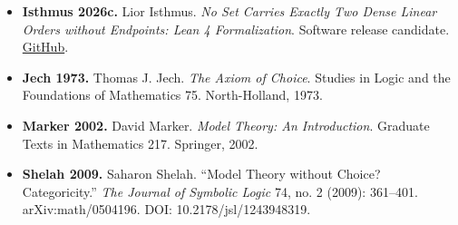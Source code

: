 \documentclass[
  english,
  11pt,
  reqno]{amsart}
\providecommand{\tightlist}{%
  \setlength{\itemsep}{0pt}\setlength{\parskip}{0pt}}
\begin{document}
\begin{itemize}
\tightlist
\item
  \textbf{Isthmus 2026c.} Lior Isthmus. \emph{No Set Carries Exactly Two
  Dense Linear Orders without Endpoints: Lean 4 Formalization}. Software
  release candidate.
  \href{https://github.com/lioristhmus/no-exactly-two-dlo-lean}{GitHub}.
\end{itemize}

\protect{}\label{ref:jech1973}

\begin{itemize}
\tightlist
\item
  \textbf{Jech 1973.} Thomas J. Jech. \emph{The Axiom of Choice}.
  Studies in Logic and the Foundations of Mathematics 75. North-Holland,
  1973.
\end{itemize}

\protect{}\label{ref:marker2002}

\begin{itemize}
\tightlist
\item
  \textbf{Marker 2002.} David Marker. \emph{Model Theory: An
  Introduction}. Graduate Texts in Mathematics 217. Springer, 2002.
\end{itemize}

\protect{}\label{ref:shelah2009}

\begin{itemize}
\tightlist
\item
  \textbf{Shelah 2009.} Saharon Shelah. ``Model Theory without Choice?
  Categoricity.'' \emph{The Journal of Symbolic Logic} 74, no. 2 (2009):
  361--401. arXiv:math/0504196. DOI: 10.2178/jsl/1243948319.
\end{itemize}
\end{document}
